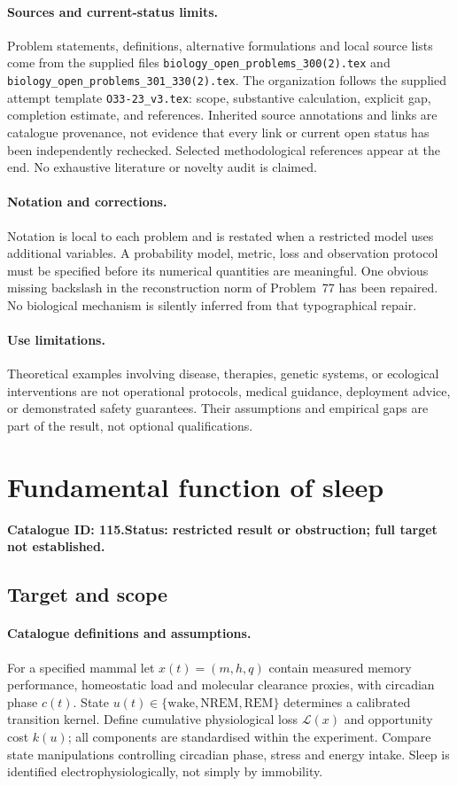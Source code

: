\documentclass[11pt]{article}
\begin{document}
\paragraph{Sources and current-status limits.}
Problem statements, definitions, alternative formulations and local source lists
come from the supplied files
\texttt{biology\_open\_problems\_300(2).tex} and
\texttt{biology\_open\_problems\_301\_330(2).tex}.
The organization follows the supplied attempt template
\texttt{O33-23\_v3.tex}: scope, substantive calculation, explicit gap,
completion estimate, and references. Inherited source annotations and links are
catalogue provenance, not evidence that every link or current open status has
been independently rechecked. Selected methodological references appear at the
end. No exhaustive literature or novelty audit is claimed.

\paragraph{Notation and corrections.}
Notation is local to each problem and is restated when a restricted model uses
additional variables. A probability model, metric, loss and observation protocol
must be specified before its numerical quantities are meaningful. One obvious
missing backslash in the reconstruction norm of Problem~77 has been repaired.
No biological mechanism is silently inferred from that typographical repair.

\paragraph{Use limitations.}
Theoretical examples involving disease, therapies, genetic systems, or ecological
interventions are not operational protocols, medical guidance, deployment advice,
or demonstrated safety guarantees. Their assumptions and empirical gaps are part
of the result, not optional qualifications.

\setcounter{section}{114}
\section{Fundamental function of sleep}
\label{prob:115}
\noindent\textbf{Catalogue ID: 115.}\quad \textbf{Status: restricted result or obstruction; full target not established.}
\subsection{Target and scope}
\paragraph{Catalogue definitions and assumptions.}
For a specified mammal let $x(t)=(m,h,q)$ contain measured memory performance, homeostatic load and molecular clearance proxies, with circadian phase $c(t)$. State $u(t)\in\{\text{wake},\text{NREM},\text{REM}\}$ determines a calibrated transition kernel. Define cumulative physiological loss $\mathcal L(x)$ and opportunity cost $k(u)$; all components are standardised within the experiment. Compare state manipulations controlling circadian phase, stress and energy intake. Sleep is identified electrophysiologically, not simply by immobility.
\end{document}
